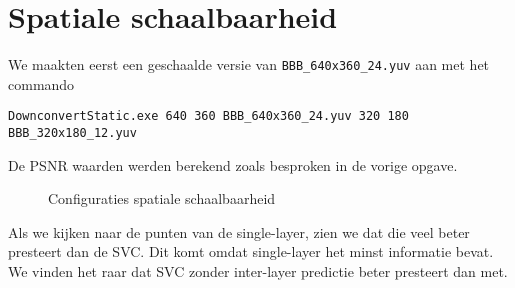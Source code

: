 \documentclass[12pt,a4paper,oneside]{article}
\begin{document}
\section{Spatiale schaalbaarheid}
We maakten eerst een geschaalde versie van \verb$BBB_640x360_24.yuv$ aan met het commando
\begin{verbatim}
DownconvertStatic.exe 640 360 BBB_640x360_24.yuv 320 180 BBB_320x180_12.yuv
\end{verbatim}
De PSNR waarden werden berekend zoals besproken in de vorige opgave.
\begin{figure}[H]
  \begin{center}
    
    \caption{Configuraties spatiale schaalbaarheid}
    \label{graph:graph1}
  \end{center}
\end{figure}
\noindent Als we kijken naar de punten van de single-layer, zien we dat die veel beter presteert dan de SVC. Dit komt omdat single-layer het minst informatie bevat. We vinden het raar dat SVC zonder inter-layer predictie beter presteert dan met.
\end{document}
